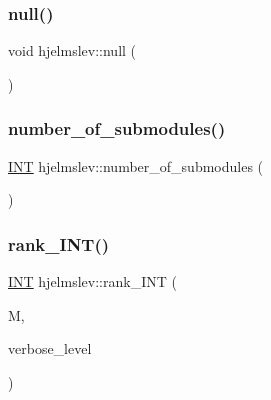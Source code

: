 \mbox{\label{classhjelmslev_aab5d00afb800a1764231587f9f032d1c}} 
\subsubsection{\texorpdfstring{null()}{null()}}
{\footnotesize\ttfamily void hjelmslev\+::null (\begin{DoxyParamCaption}{ }\end{DoxyParamCaption})}

\mbox{\label{classhjelmslev_a2bc314ecd7196a77cd91d98d7b5ccdac}} 
\subsubsection{\texorpdfstring{number\+\_\+of\+\_\+submodules()}{number\_of\_submodules()}}
{\footnotesize\ttfamily \mbox{\hyperlink{galois_8h_a09fddde158a3a20bd2dcadb609de11dc}{I\+NT}} hjelmslev\+::number\+\_\+of\+\_\+submodules (\begin{DoxyParamCaption}{ }\end{DoxyParamCaption})}

\mbox{\label{classhjelmslev_a3553bea3124db20b561f1e8340250edd}} 
\subsubsection{\texorpdfstring{rank\+\_\+\+I\+N\+T()}{rank\_INT()}}
{\footnotesize\ttfamily \mbox{\hyperlink{galois_8h_a09fddde158a3a20bd2dcadb609de11dc}{I\+NT}} hjelmslev\+::rank\+\_\+\+I\+NT (\begin{DoxyParamCaption}\item[{\mbox{\hyperlink{galois_8h_a09fddde158a3a20bd2dcadb609de11dc}{I\+NT}} $\ast$}]{M,  }\item[{\mbox{\hyperlink{galois_8h_a09fddde158a3a20bd2dcadb609de11dc}{I\+NT}}}]{verbose\+\_\+level }\end{DoxyParamCaption})}

\mbox{\label{classhjelmslev_a2b12e27ee4856b95fb031ead8500e307}} 
